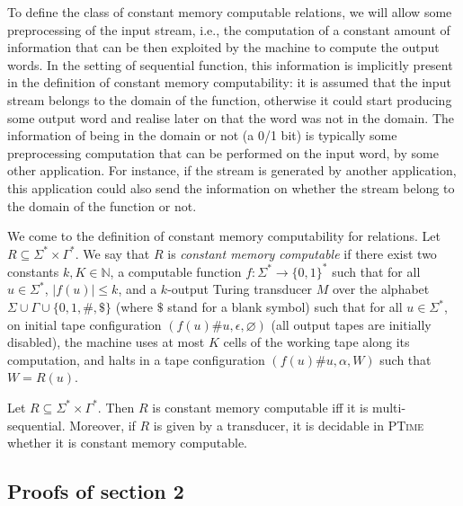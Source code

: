 \documentclass[envcountsame]{llncs}
\begin{document}
To define the class of constant memory computable relations, we will
allow some preprocessing of the input stream, i.e., the computation of 
a constant amount of information that can be then exploited by the
machine to compute the output words. In the setting of sequential
function, this information is implicitly present in the definition of
constant memory computability: it is assumed that the input stream belongs to the domain
of the function, otherwise it could start producing some output word
and realise later on that the word was not in the domain. The
information of being in the domain or not (a 0/1 bit) is typically some
preprocessing computation that can be performed on the input word, by
some other application. For instance, if the stream is generated by
another application, this application could also send the information
on whether the stream belong to the domain of the function or not. 


We come to the definition of constant memory computability for
relations. Let $R\subseteq \Sigma^*\times
\Gamma^*$. We say that $R$ is \emph{constant memory computable} if
there exist two constants $k, K\in\mathbb{N}$, a
computable function $f : \Sigma^* \rightarrow \{0,1\}^*$ such that for
all $u\in\Sigma^*$, $|f(u)|\leq k$, and a $k$-output Turing transducer $M$ over the alphabet $\Sigma \cup
\Gamma \cup \{0,1,\#,\$\}$ (where $\$$ stand for a blank symbol) such
that for all $u\in\Sigma^*$, on initial tape
configuration $(f(u)\#u, \epsilon, \varnothing)$ (all output tapes are
initially disabled), the machine uses at most $K$ cells of the working tape
along its computation,  and halts in  a tape configuration $(f(u)\#u,
\alpha, W)$ such that  $W = R(u)$. 


\begin{theorem}\label{thm:streaming}
    Let $R\subseteq \Sigma^*\times \Gamma^*$. Then $R$ is constant
    memory computable iff it is multi-sequential. Moreover, if $R$ is given by a transducer, it is decidable in
          \textsc{PTime} whether it is constant memory computable. 
\end{theorem}











\newpage


\appendix
{}
\medskip 

\subsection*{Proofs of section 2}
\end{document}
